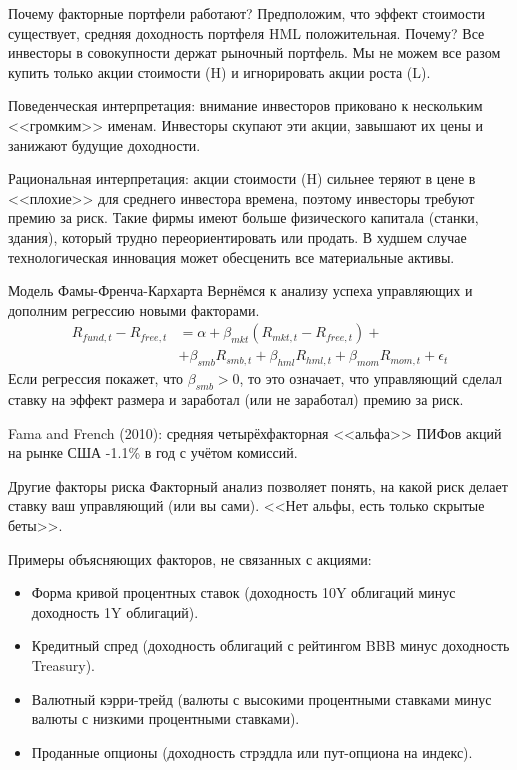 \documentclass{beamer}
\begin{document}
\begin{frame}{Почему факторные портфели работают?}
\justify
Предположим, что эффект стоимости существует, средняя доходность портфеля HML положительная. Почему? Все инвесторы в совокупности держат рыночный портфель. Мы не можем все разом купить только акции стоимости (H) и игнорировать акции роста (L).

\justify
Поведенческая интерпретация: внимание инвесторов приковано к нескольким <<громким>> именам. Инвесторы скупают эти акции, завышают их цены и занижают будущие доходности.

\justify
Рациональная интерпретация: акции стоимости (H) сильнее теряют в цене в <<плохие>> для среднего инвестора времена, поэтому инвесторы требуют премию за риск. Такие фирмы имеют больше физического капитала (станки, здания), который трудно переориентировать или продать. В худшем случае технологическая инновация может обесценить все материальные активы.

\end{frame}



\begin{frame}{Модель Фамы-Френча-Кархарта}
\justify
Вернёмся к анализу успеха управляющих и дополним регрессию новыми факторами.
\begin{align*}
R_{fund,t} - R_{free,t} &= \alpha + \beta_{mkt}(R_{mkt,t} - R_{free,t}) + \\ &+ \beta_{smb}R_{smb,t} + \beta_{hml}R_{hml,t} + \beta_{mom}R_{mom,t} + \epsilon_t
\end{align*}
Если регрессия покажет, что $\beta_{smb} > 0$, то это означает, что управляющий сделал ставку на эффект размера и заработал (или не заработал) премию за риск.

\vspace{\baselineskip}
Fama and French (2010): средняя четырёхфакторная <<альфа>> ПИФов акций на рынке США -1.1\% в год с учётом комиссий.
\end{frame}



\begin{frame}{Другие факторы риска}
\justify
Факторный анализ позволяет понять, на какой риск делает ставку ваш управляющий (или вы сами). <<Нет альфы, есть только скрытые беты>>.

\vspace{\baselineskip}
Примеры объясняющих факторов, не связанных с акциями:
\begin{itemize}
\justifying
\item Форма кривой процентных ставок (доходность 10Y облигаций минус доходность 1Y облигаций).
\item Кредитный спред (доходность облигаций с рейтингом BBB минус доходность Treasury).
\item Валютный кэрри-трейд (валюты с высокими процентными ставками минус валюты с низкими процентными ставками).
\item Проданные опционы (доходность стрэддла или пут-опциона на индекс).
\end{itemize}
\end{frame}
\end{document}
